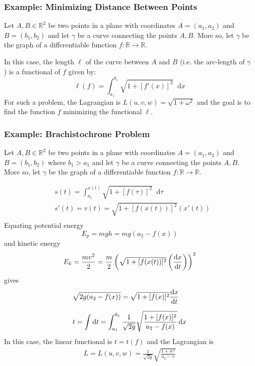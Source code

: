\documentclass[11pt, a4paper]{article}
\newcommand{\diff}{\mathop{}\!\mathrm{d}} %
\newcommand{\R}{\mathbb{R}} %
\begin{document}
\subsubsection{Example: Minimizing Distance Between Points}
Let $ A, B \in \R^2 $ be two points in a plane with coordinates $ A = (a_1, a_2) $ and $ B = (b_1, b_2) $ and let $ \gamma $ be a curve connecting the points $ A, B $. More so, let $ \gamma $ be the graph of a differentiable function $ f : \R \to \R $. 

In this case, the length $ \ell $ of the curve between $ A $ and $ B $ (i.e. the arc-length of $ \gamma $ ) is a functional of $ f $ given by:
\begin{equation*}
	\ell(f) = \int_{a_1}^{b_1} \sqrt{1 + [f'(x)]^2} \diff x
\end{equation*}
For such a problem, the Lagrangian is $ L(u, v, w) = \sqrt{1 + \omega^2} $ and the goal is to find the function $ f $ minimizing the functional $ \ell $.

\subsubsection{Example: Brachistochrone Problem}
Let $ A, B \in \R^2 $ be two points in a plane with coordinates $ A = (a_1, a_2) $ and $ B = (b_1, b_2) $ where $ b_1 > a_1 $ and let $ \gamma $ be a curve connecting the points $ A, B $. More so, let $ \gamma $ be the graph of a differentiable function $ f : \R \to \R $. 

\begin{align*}
	&s(t) = \int_{a_1}^{x(t)} \sqrt{1 + [f(\tau)]^2} \diff \tau \\[1.0ex]
	&s'(t) = v(t) = \sqrt{1 + [f(x(t))]^2} (x'(t)) \\[1.0ex]
\end{align*}
Equating potential energy 
\begin{equation*}
	E_p = mgh = mg (a_2 - f(x))
\end{equation*}
and kinetic energy
\begin{equation*}
	E_k = \frac{mv^2}{2} = \frac{m}{2} \left (\sqrt{1 + [f(x(t))]^2} \left (\dv{x}{t}\right ) \right )^2
\end{equation*}
gives
\begin{align*}
	&\sqrt{2 g (a_2 - f(x))} = \sqrt{1 + [f(x)]^2} \dv{x}{t} \\[1.5ex]
	&t = \int \diff t = \int_{a_1}^{b_1} \frac{1}{\sqrt{2g}} \sqrt{\frac{1 + [f(x)]^2}{a_2 - f(x)}} \diff x
\end{align*}
In this case, the linear functional is $ t = t(f) $ and the Lagrangian is 
\begin{align*}
	L = L(u, v, w) =  \frac{1}{\sqrt{2g}} \sqrt{\frac{1 + w^2}{a_2 - v}}
\end{align*}
\end{document}

